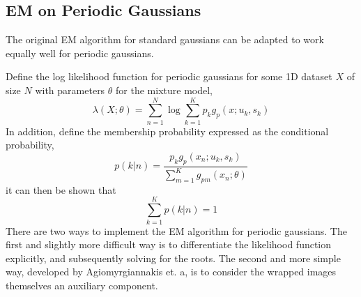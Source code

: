\documentclass{acm_proc_article-sp}
\begin{document}
\subsection{EM on Periodic Gaussians}

The original EM algorithm for standard gaussians can be adapted to work equally well for periodic gaussians.

Define the log likelihood function for periodic gaussians for some 1D dataset \textbf{$X$} of size \textbf{$N$} with parameters \textbf{$\theta$} for the mixture model,
\begin{equation}
\lambda(X; \theta) = \sum_{n=1}^{N} \log \sum_{k=1}^{K} p_k g_p(x;u_k, s_k)
\end{equation}
In addition, define the membership probability expressed as the conditional probability,
\begin{equation}
p(k|n) = \dfrac{p_k g_p(x_n; u_k, s_k)}{\sum\limits^{K}_{m=1} g_{pm} (x_n; \theta)}
\end{equation}
it can then be shown that
\begin{equation}
\sum_{k=1}^{K} p(k|n) = 1
\end{equation}
There are two ways to implement the EM algorithm for periodic gaussians. The first and slightly more difficult way is to differentiate the likelihood function explicitly, and subsequently solving for the roots. The second and more simple way, developed by Agiomyrgiannakis et. a, is to consider the wrapped images themselves an auxiliary component.
\end{document}
